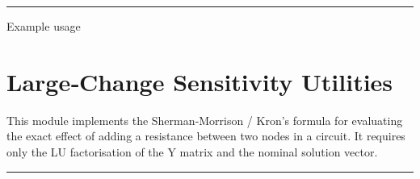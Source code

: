 \documentclass[letterpaper,10pt,english]{sphinxmanual}
\begin{document}
\bigskip\hrule\bigskip


\sphinxAtStartPar
Example usage

\begin{sphinxVerbatim}[commandchars=\\\{\}]
  
   
     
\end{sphinxVerbatim}

\sphinxstepscope


\chapter{Large‑Change Sensitivity Utilities}
\label{\detokenize{large_change_sensitivity:largechange-sensitivity-utilities}}\label{\detokenize{large_change_sensitivity:large-change-sensitivity-module}}\label{\detokenize{large_change_sensitivity::doc}}
\sphinxAtStartPar
This module implements the Sherman‑Morrison / Kron’s formula for evaluating the exact effect of adding a resistance between two nodes in a circuit.
It requires only the LU factorisation of the Y matrix and the nominal solution vector.


\bigskip\hrule\bigskip

\end{document}
